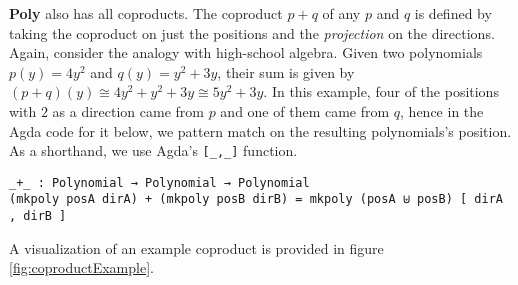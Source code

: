 \textbf{Poly} also has all coproducts. The coproduct $p+q$ of any $p$ and $q$ is defined by taking the coproduct on just the positions and the \textit{projection} on the directions. Again, consider the analogy with high-school algebra. Given two polynomials $p(y) = 4y^2$ and $q(y) = y^2 + 3y$, their sum is given by $(p + q)(y) \cong 4y^2 + y^2 + 3y \cong 5y^2 + 3y$. In this example, four of the positions with $2$ as a direction came from $p$ and one of them came from $q$, hence in the Agda code for it below, we pattern match on the resulting polynomials's position. As a shorthand, we use Agda's \texttt{[_,_]} function.

\begin{verbatim}
_+_ : Polynomial → Polynomial → Polynomial
(mkpoly posA dirA) + (mkpoly posB dirB) = mkpoly (posA ⊎ posB) [ dirA , dirB ]
\end{verbatim}

A visualization of an example coproduct is provided in figure \ref{fig:coproductExample}.

